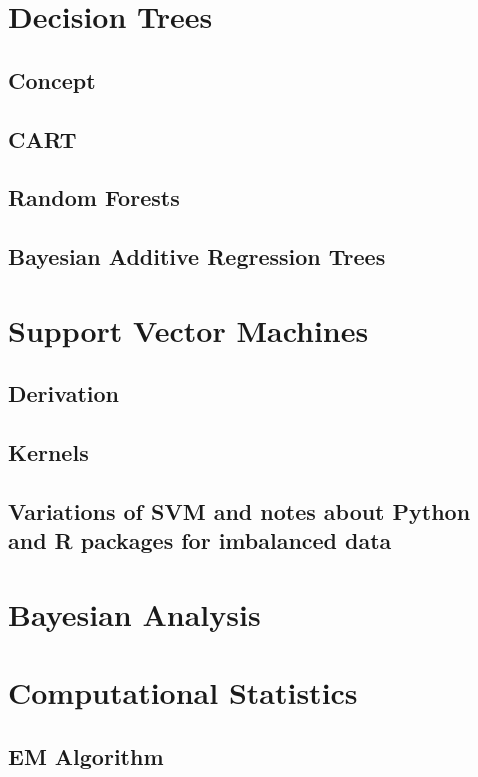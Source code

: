 \documentclass[12pt]{article}
\begin{document}
\newpage


\section{Decision Trees}
\subsection{Concept}
\subsection{CART}
\subsection{Random Forests}
\subsection{Bayesian Additive Regression Trees}

\newpage

\section{Support Vector Machines}
\subsection{Derivation}
\subsection{Kernels}
\subsection{Variations of SVM and notes about Python and R packages for imbalanced data}

\newpage

\section{Bayesian Analysis}

\newpage

\section{Computational Statistics}
    \subsection{EM Algorithm}
\end{document}
